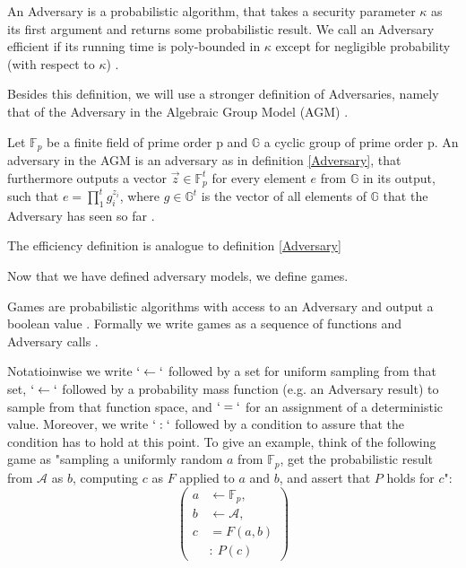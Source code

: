 \begin{definition}
    \label{Adversary}
An Adversary is a probabilistic algorithm, that takes a security parameter $\kappa$ as its first argument and returns some probabilistic result. 
We call an Adversary efficient if its running time is poly-bounded in $\kappa$ except for negligible probability (with respect to $\kappa$)
\parencite{boneh_shoup}.
\end{definition}

Besides this definition, we will use a stronger definition of Adversaries, namely that of the Adversary in the Algebraic Group Model (AGM) \parencite{AGM}.

\begin{definition}
    Let $\mathbb{F}_p$ be a finite field of prime order p and $\mathbb{G}$ a cyclic group of prime order p. An adversary in the AGM is an adversary as in definition \ref{Adversary}, that furthermore outputs a vector $\vec{z} \in \mathbb{F}_p^t$ for every element $e$ from $\mathbb{G}$ in its output, such that $e = \prod_{1}^{t} g_i^{z_i}$, where $g\in \mathbb{G}^t$ is the vector of all elements of $\mathbb{G}$ that the Adversary has seen so far
    \parencite{AGM}. 

    The efficiency definition is analogue to definition \ref*{Adversary}
\end{definition}

Now that we have defined adversary models, we define games. 

\begin{definition}[games]
Games are probabilistic algorithms with access to an Adversary and output a boolean value \parencite{boneh_shoup}. Formally we write games as a sequence of functions and Adversary calls \parencite{boneh_shoup}.
\end{definition}

Notatioinwise we write $`\leftarrow`$ followed by a set for uniform sampling from that set, $`\leftarrow`$ followed by a probability mass function (e.g. an Adversary result) to sample from that function space, and $`=`$ for an assignment of a deterministic value. Moreover, we write $`:`$ followed by a condition to assure that the condition has to hold at this point. To give an example, think of the following game as "sampling a uniformly random $a$ from $\mathbb{F}_p$, get the probabilistic result from $\mathcal{A}$ as $b$, computing $c$ as $F$ applied to $a$ and $b$, and assert that $P$ holds for $c$":
\begin{equation*}
    \left(
    \begin{aligned}
        a & \leftarrow \mathbb{F}_p, \\
        b & \leftarrow \mathcal{A}, \\
        c & = F(a,b) \\
        & : \ P(c)
    \end{aligned}
    \right)
\end{equation*}

